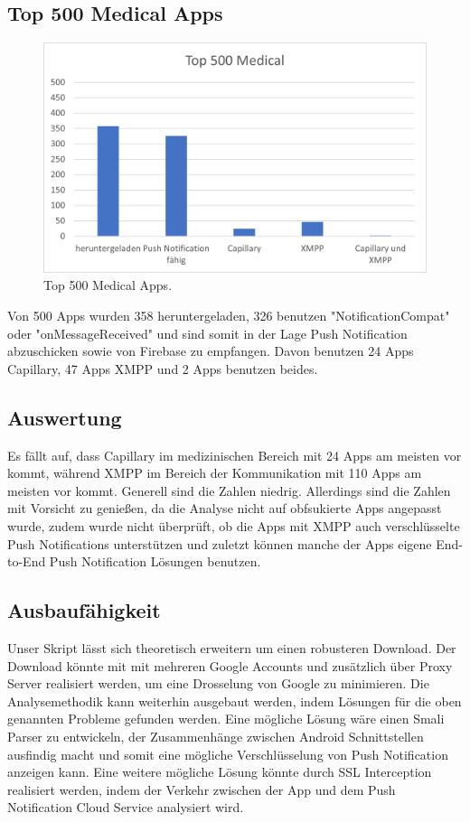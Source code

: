 \documentclass[sigconf]{acmart}
\begin{document}
\subsection{Top 500 Medical Apps}

\begin{figure}[H]
  \centering
  \includegraphics[width=\linewidth]{sample-auswertung3}
  \caption{Top 500 Medical Apps.}
\end{figure}

Von 500 Apps wurden 358 heruntergeladen, 326 benutzen "NotificationCompat" oder "onMessageReceived" 
und sind somit in der Lage Push Notification abzuschicken sowie von Firebase zu empfangen. Davon benutzen 24 Apps Capillary, 
47 Apps XMPP und 2 Apps benutzen beides.

\subsection{Auswertung}
Es fällt auf, dass Capillary im medizinischen Bereich mit 24 Apps am meisten vor kommt, während XMPP im Bereich
der Kommunikation mit 110 Apps am meisten vor kommt. Generell sind die Zahlen niedrig.
 Allerdings sind die Zahlen mit Vorsicht zu genießen, da die
Analyse nicht auf obfsukierte Apps angepasst wurde, zudem wurde nicht überprüft, ob die Apps mit XMPP auch verschlüsselte 
Push Notifications unterstützen und zuletzt können manche der Apps eigene End-to-End Push Notification Lösungen benutzen.

\subsection{Ausbaufähigkeit}
Unser Skript lässt sich theoretisch erweitern um einen robusteren Download. Der Download könnte mit mit 
mehreren Google Accounts und zusätzlich über Proxy Server realisiert werden, um eine Drosselung von Google 
zu minimieren.
Die Analysemethodik kann weiterhin ausgebaut werden, indem Lösungen für die oben genannten Probleme gefunden werden.
Eine mögliche Lösung wäre einen Smali Parser zu entwickeln, der Zusammenhänge zwischen Android Schnittstellen ausfindig macht
und somit eine mögliche Verschlüsselung von Push Notification anzeigen kann. Eine weitere mögliche Lösung könnte durch SSL Interception
realisiert werden, indem der Verkehr zwischen der App und dem Push Notification Cloud Service analysiert wird.



\end{document}
